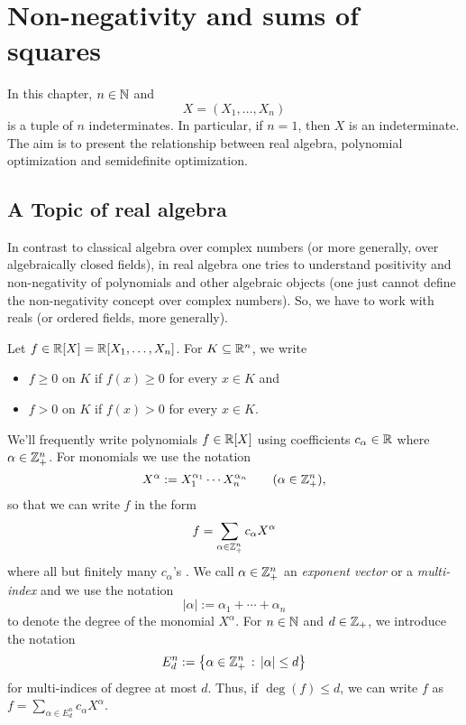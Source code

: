 \section{Non-negativity and sums of squares} 

In this chapter, $n \in \mathbb{N}$ and  
\[
X=(X_1,\ldots,X_n)
\]
is a tuple of $n$ indeterminates. In particular, if $n=1$, then $X$ is an indeterminate. The aim is to present the relationship between real algebra, polynomial optimization and semidefinite optimization. 

\subsection{A Topic of real algebra}

In contrast to classical algebra over complex numbers (or more generally, over algebraically closed fields), in real algebra one tries to understand positivity and non-negativity of polynomials and other algebraic objects (one just cannot define the non-negativity concept over complex numbers). So, we have to work with reals (or ordered fields, more generally). 

Let $f \in \mathbb{R}[X]=\mathbb{R}[X_1,\ldots,X_n]$. For $K \subseteq \mathbb{R}^n$, we write 
\begin{itemize}
	\item $f \ge 0$ on $K$ if $f(x) \ge 0$ for every $x \in K$ and 
	\item $f > 0$ on $K$ if $f(x)> 0$ for every $x \in K$.
\end{itemize}


We'll frequently write polynomials $f \in \mathbb{R}[X]$ using coefficients $c_\alpha \in \mathbb{R}$ where $\alpha \in \mathbb{Z}_+^n$. For monomials we use the notation
\[
	X^\alpha := X_1^{\alpha_1} \cdots X_n^{\alpha_n}  \qquad (\alpha \in \mathbb{Z}_+^n),
\]
so that we can write $f$ in the form 
\[
	f = \sum_{\alpha \in \mathbb{Z}_+^n} c_\alpha X^\alpha
\] 
where all but finitely many $c_\alpha$'s . 
We call $\alpha \in \mathbb{Z}_+^n$ an \emph{exponent vector} or a \emph{multi-index} and we use the notation
\[
	|\alpha| := \alpha_1 + \cdots + \alpha_n
\]
to denote the degree of the monomial $X^\alpha$. For $n \in \mathbb{N}$ and $d \in \mathbb{Z}_+$, we introduce the notation 
\[
	E^n_d := \left\{ \alpha \in \mathbb{Z}_+^n \,:\, |\alpha| \le d \right\}
\]
for  multi-indices of degree at most $d$. Thus, if $\deg(f) \le d$, we can write $f$ as $f = \sum_{\alpha \in E^n_d} c_\alpha X^\alpha$. 

